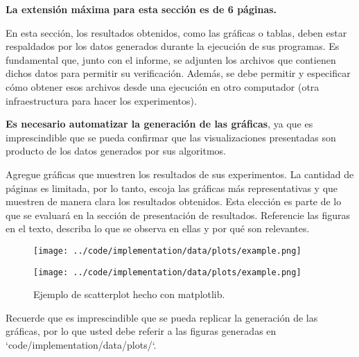 \begin{mdframed}
    \textbf{La extensión máxima para esta sección es de 6 páginas.}
\end{mdframed}


En esta sección, los resultados obtenidos, como las gráficas o tablas, deben estar respaldados por los datos generados durante la ejecución de sus programas. Es fundamental que, junto con el informe, se adjunten los archivos que contienen dichos datos para permitir su verificación. Además, se debe permitir y especificar cómo obtener esos archivos desde una ejecución en otro computador (otra infraestructura para hacer los experimentos).

\textbf{Es necesario automatizar la generación de las gráficas}, ya que es imprescindible que se pueda confirmar que las visualizaciones presentadas son producto de los datos generados por sus algoritmos.

Agregue gráficas que muestren los resultados de sus experimentos. La cantidad de páginas es limitada, por lo tanto, escoja las gráficas más representativas y que muestren de manera clara los resultados obtenidos. Esta elección es parte de lo que se evaluará en la sección de presentación de resultados. Referencie las figuras en el texto, describa lo que se observa en ellas y por qué son relevantes.




\begin{figure}[H]
    \centering
    \begin{minipage}[t]{0.5\textwidth}
        \texttt{[image: ../code/implementation/data/plots/example.png]}
    \end{minipage}%
    \begin{minipage}[t]{0.5\textwidth}
        \texttt{[image: ../code/implementation/data/plots/example.png]}
     \end{minipage}%
    \caption{Ejemplo de scatterplot hecho con matplotlib.}
    \label{fig:scatterplot_3}
\end{figure}





\begin{mdframed}
    Recuerde que es imprescindible que se pueda replicar la generación de las gráficas, por lo que usted debe referir a las figuras generadas en `code/implementation/data/plots/`.
\end{mdframed}
